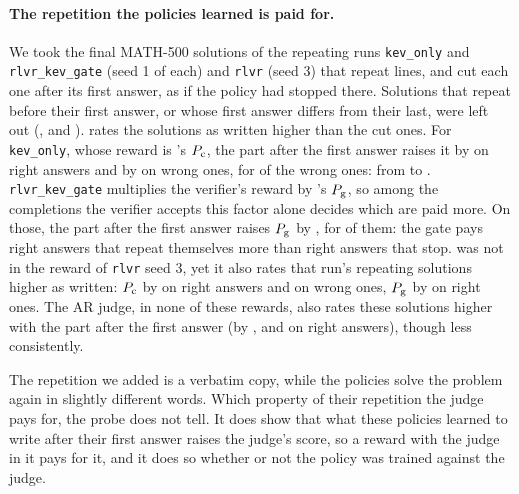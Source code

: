 \paragraph{The repetition the policies learned is paid for.} We took the final MATH-500 solutions of the repeating runs
\texttt{kev\_only} and \texttt{rlvr\_kev\_gate} (seed 1 of each) and \texttt{rlvr} (seed 3) that repeat lines, and cut
each one after its first answer, as if the policy had stopped there. Solutions that repeat before their first answer,
or whose first answer differs from their last, were left out (,  and
). \kev{} rates the solutions as written higher than the cut ones. For \texttt{kev\_only}, whose reward
is \kev{}'s $P_{\mathrm{c}}$, the part after the first answer raises it by 
 on right answers and by 
 on wrong ones, for  of the wrong
ones: from  to . \texttt{rlvr\_kev\_gate} multiplies the
verifier's reward by \kev{}'s $P_{\mathrm{g}}$, so among the completions the verifier accepts this factor alone decides which are
paid more. On those, the part after the first answer raises $P_{\mathrm{g}}$ by 
, for  of them: the gate pays
right answers that repeat themselves more than right answers that stop. \kev{} was not in the reward of \texttt{rlvr}
seed 3, yet it also rates that run's repeating solutions higher as written: $P_{\mathrm{c}}$ by
  on right answers and
  on wrong ones, $P_{\mathrm{g}}$ by
 on right ones. The AR judge, in none of these rewards, also rates these solutions higher with the
part after the first answer (by ,  and  on right
answers), though less consistently.

The repetition we added is a verbatim copy, while the policies solve the problem again in slightly different words.
Which property of their repetition the judge pays for, the probe does not tell. It does show that what these policies
learned to write after their first answer raises the judge's score, so a reward with the judge in it pays for it, and
it does so whether or not the policy was trained against the judge.

